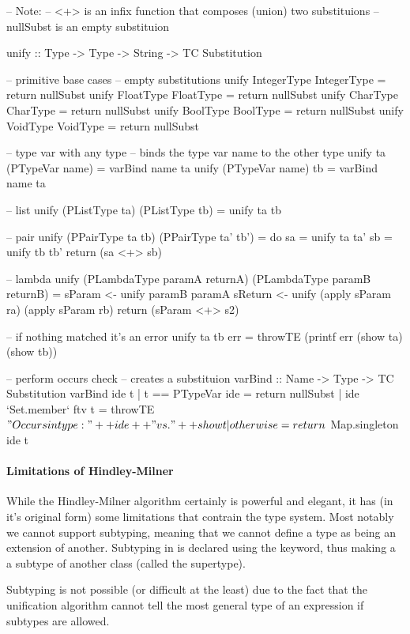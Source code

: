 \begin{haskell}[]
-- Note:
-- <+> is an infix function that composes (union) two substituions
-- nullSubst is an empty substituion

unify :: Type -> Type -> String -> TC Substitution

-- primitive base cases
-- empty substitutions
unify IntegerType IntegerType = return nullSubst
unify FloatType FloatType     = return nullSubst
unify CharType CharType       = return nullSubst
unify BoolType BoolType       = return nullSubst
unify VoidType VoidType       = return nullSubst

-- type var with any type
-- binds the type var name to the other type
unify ta (PTypeVar name) = varBind name ta
unify (PTypeVar name) tb = varBind name ta

-- list
unify (PListType ta) (PListType tb) = unify ta tb

-- pair
unify (PPairType ta tb) (PPairType ta' tb') = do
  sa = unify ta ta'
  sb = unify tb tb'
  return (sa <+> sb)

-- lambda
unify (PLambdaType paramA returnA) (PLambdaType paramB returnB) =
  sParam <- unify paramB paramA
  sReturn <- unify (apply sParam ra) (apply sParam rb)
  return (sParam <+> s2)

-- if nothing matched it's an error
unify ta tb err = throwTE (printf err (show ta) (show tb))

-- perform occurs check
-- creates a substituion
varBind :: Name -> Type -> TC Substitution
varBind ide t | t == PTypeVar ide = return nullSubst
              | ide `Set.member` ftv t = throwTE $ "Occurs in type: " ++ ide ++ " vs. " ++ show t
              | otherwise = return $ Map.singleton ide t

\end{haskell}


\paragraph{Limitations of Hindley-Milner}
While the Hindley-Milner algorithm certainly is powerful and elegant, it has (in it's original form) some limitations that contrain the type system. Most notably we cannot support subtyping, meaning that we cannot define a type as being an extension of another. Subtyping in  is declared using the  keyword, thus making a  a subtype of another class (called the supertype).

Subtyping is not possible (or difficult at the least) due to the fact that the unification algorithm cannot tell the most general type of an expression if subtypes are allowed.

